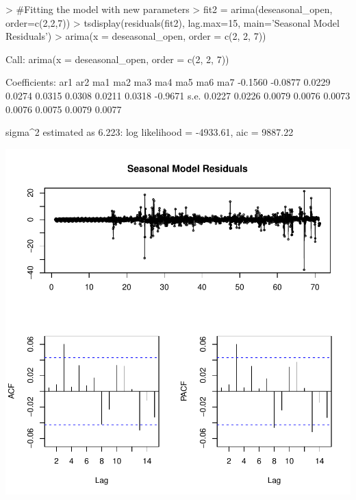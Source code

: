 \documentclass{article}
\begin{document}
\begin{Schunk}
\begin{Sinput}
> #Fitting the model with new parameters
> fit2 = arima(deseasonal_open, order=c(2,2,7))
> tsdisplay(residuals(fit2), lag.max=15, main='Seasonal Model Residuals')
> arima(x = deseasonal_open, order = c(2, 2, 7))
\end{Sinput}
\begin{Soutput}
Call:
arima(x = deseasonal_open, order = c(2, 2, 7))

Coefficients:
          ar1      ar2     ma1     ma2     ma3     ma4     ma5     ma6      ma7
      -0.1560  -0.0877  0.0229  0.0274  0.0315  0.0308  0.0211  0.0318  -0.9671
s.e.   0.0227   0.0226  0.0079  0.0076  0.0073  0.0076  0.0075  0.0079   0.0077

sigma^2 estimated as 6.223:  log likelihood = -4933.61,  aic = 9887.22
\end{Soutput}
\end{Schunk}
\includegraphics{Report-019}
\end{document}
